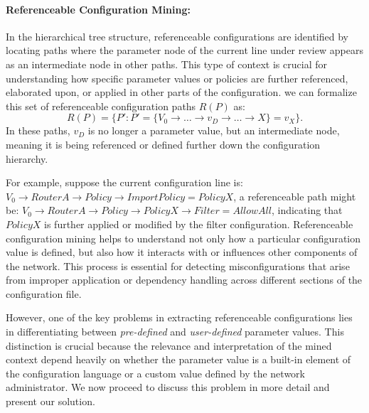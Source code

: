 \paragraph{Referenceable Configuration Mining:} In the hierarchical tree structure, referenceable configurations are identified by locating paths where the parameter node of the current line under review appears as an intermediate node in other paths. This type of context is crucial for understanding how specific parameter values or policies are further referenced, elaborated upon, or applied in other parts of the configuration. we can formalize this  set of referenceable configuration paths \( R(P) \) as:
\[
R(P) = \{ P' : P' = \{ V_0 \rightarrow \dots \rightarrow v_D \rightarrow \dots \rightarrow X \} = v_{X}\}.
\]
In these paths, \( v_D \) is no longer a parameter value, but an intermediate node, meaning it is being referenced or defined further down the configuration hierarchy.

For example, suppose the current configuration line is:
\(V_0 \rightarrow RouterA \rightarrow Policy \rightarrow ImportPolicy = PolicyX\), a referenceable path might be:
\(
V_0 \rightarrow  RouterA \rightarrow Policy \rightarrow PolicyX \rightarrow Filter = AllowAll
\),
indicating that \( PolicyX \) is further applied or modified by the filter configuration. Referenceable configuration mining helps to understand not only how a particular configuration value is defined, but also how it interacts with or influences other components of the network. This process is essential for detecting misconfigurations that arise from improper application or dependency handling across different sections of the configuration file.



However, one of the key problems in extracting referenceable configurations lies in differentiating between \textit{pre-defined} and \textit{user-defined} parameter values. This distinction is crucial because the relevance and interpretation of the mined context depend heavily on whether the parameter value is a built-in element of the configuration language or a custom value defined by the network administrator. We now proceed to discuss this problem in more detail and present our solution.

